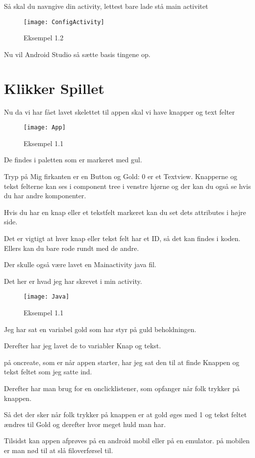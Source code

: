 Så skal du navngive din activity, lettest bare lade stå main activitet 

\begin{figure}[H]
	\texttt{[image: ConfigActivity]}
	\caption{Eksempel 1.2}
	\label{fig:Config Activiy}
\end{figure}

Nu vil Android Studio så sætte basis tingene op. 

\section*{Klikker Spillet}

Nu da vi har fået lavet skelettet til appen skal vi have knapper og text felter

\begin{figure}[H]
	\texttt{[image: App]}
	\caption{Eksempel 1.1}
	\label{fig:App}
\end{figure}

De findes i paletten som er markeret med gul. 

Tryp på Mig firkanten er en Button og Gold: 0 er et Textview. 
Knapperne og tekst felterne kan ses i component tree i venstre hjørne og der kan du også se hvis du har andre komponenter.

Hvis du har en knap eller et tekstfelt markeret kan du set dets attributes i højre side.

Det er vigtigt at hver knap eller tekst felt har et ID, så det kan findes i koden. Ellers kan du bare rode rundt med de andre. 

Der skulle også være lavet en Mainactivity java fil.

Det her er hvad jeg har skrevet i min activity. 
\begin{figure}[H]
	\texttt{[image: Java]}
	\caption{Eksempel 1.1}
	\label{fig:Java}
\end{figure}

Jeg har sat en variabel gold som har styr på guld beholdningen. 

Derefter har jeg lavet de to variabler Knap og tekst. 

på oncreate, som er når appen starter, har jeg sat den til at finde Knappen og tekst feltet som jeg satte ind. 

Derefter har man brug for en onclicklistener, som opfanger når folk trykker på knappen. 

Så det der sker når folk trykker på knappen er at gold øges med 1 og tekst feltet ændres til Gold og derefter hvor meget huld man har. 

Tilsidst kan appen afprøves på en android mobil eller på en emulator. på mobilen er man nød til at slå filoverførsel til. 






